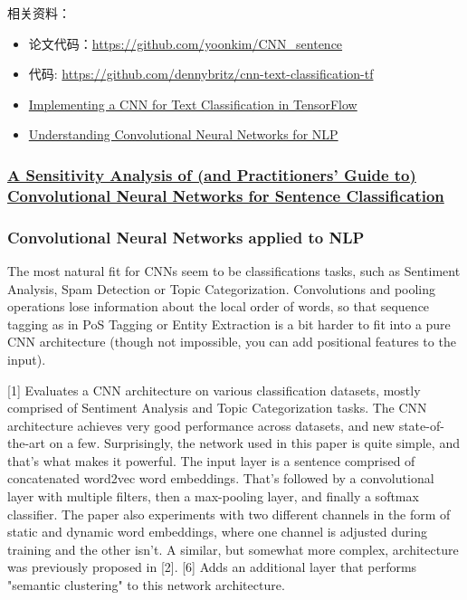 \documentclass[10pt,a4paper]{ctexbook}
\begin{document}
相关资料：
\begin{itemize}
\item 论文代码：\url{https://github.com/yoonkim/CNN_sentence}
\item 代码: \url{https://github.com/dennybritz/cnn-text-classification-tf}
\item \href{http://www.wildml.com/2015/12/implementing-a-cnn-for-text-classification-in-tensorflow/}{Implementing a CNN for Text Classification in TensorFlow}
\item \href{http://www.wildml.com/2015/11/understanding-convolutional-neural-networks-for-nlp/}{Understanding Convolutional Neural Networks for NLP}
\end{itemize}

\subsubsection{\href{https://arxiv.org/abs/1510.03820}{A Sensitivity Analysis of (and Practitioners’ Guide to) Convolutional Neural Networks for Sentence Classification}}

\subsubsection{Convolutional Neural Networks applied to NLP}

The most natural fit for CNNs seem to be classifications tasks, such as Sentiment Analysis, Spam Detection or Topic Categorization. Convolutions and pooling operations lose information about the local order of words, so that sequence tagging as in PoS Tagging or Entity Extraction is a bit harder to fit into a pure CNN architecture (though not impossible, you can add positional features to the input).

[1] Evaluates a CNN architecture on various classification datasets, mostly comprised of Sentiment Analysis and Topic Categorization tasks. The CNN architecture achieves very good performance across datasets, and new state-of-the-art on a few. Surprisingly, the network used in this paper is quite simple, and that's what makes it powerful. The input layer is a sentence comprised of concatenated word2vec word embeddings. That's followed by a convolutional layer with multiple filters, then a max-pooling layer, and finally a softmax classifier. The paper also experiments with two different channels in the form of static and dynamic word embeddings, where one channel is adjusted during training and the other isn't. A similar, but somewhat more complex, architecture was previously proposed in [2]. [6] Adds an additional layer that performs "semantic clustering" to this network architecture.
\end{document}
